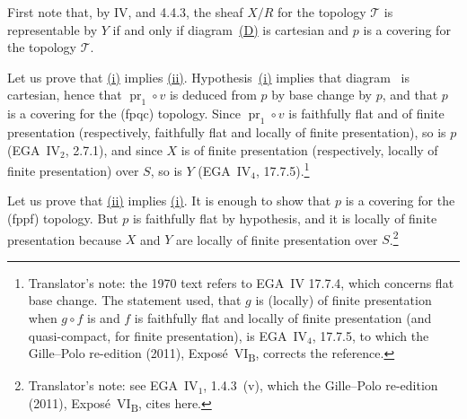 First note that, by IV,  and 4.4.3, the sheaf \(X/R\) for
the topology \(\mathcal T\) is representable by \(Y\) if and
only if diagram~\hyperref[diag:sga3-VIB-10.8-D]{\textup{(D)}}
is cartesian and \(p\) is a covering for the topology
\(\mathcal T\).

Let us prove that
\hyperref[concl:sga3-VIB-10.8-i]{\textup{(i)}} implies
\hyperref[concl:sga3-VIB-10.8-ii]{\textup{(ii)}}.
Hypothesis~\hyperref[concl:sga3-VIB-10.8-i]{\textup{(i)}}
implies that diagram~\hyperref[diag:sga3-VIB-10.8-D]%
{} is cartesian, hence that
\(\operatorname{pr}_1\circ v\) is deduced from \(p\) by base
change by \(p\), and that \(p\) is a covering for the
\textup{(fpqc)} topology. Since \(\operatorname{pr}_1\circ v\)
is faithfully flat and of finite presentation
\textup{(respectively, faithfully flat and locally of finite
presentation)}, so is \(p\) (EGA~IV\(_2\), 2.7.1), and since
\(X\) is of finite presentation \textup{(respectively, locally
of finite presentation)} over \(S\), so is \(Y\)
(EGA~IV\(_4\), 17.7.5).\footnote{Translator's note: the 1970 text refers to EGA~IV 17.7.4, which
concerns flat base change. The statement used, that \(g\) is (locally) of finite presentation when \(g\circ f\)
is and \(f\) is faithfully flat and locally of finite presentation (and quasi-compact, for finite
presentation), is EGA~IV\(_4\), 17.7.5, to which the Gille--Polo re-edition (2011),
Expos\'e~VI\textsubscript{B}, corrects the reference.}

Let us prove that
\hyperref[concl:sga3-VIB-10.8-ii]{\textup{(ii)}} implies
\hyperref[concl:sga3-VIB-10.8-i]{\textup{(i)}}. It is enough
to show that \(p\) is a covering for the \textup{(fppf)}
topology. But \(p\) is faithfully flat by hypothesis, and it
is locally of finite presentation because \(X\) and \(Y\) are
locally of finite presentation over \(S\).\footnote{Translator's note: see EGA~IV\(_1\), 1.4.3~(v),
which the Gille--Polo re-edition (2011), Expos\'e~VI\textsubscript{B}, cites here.}
